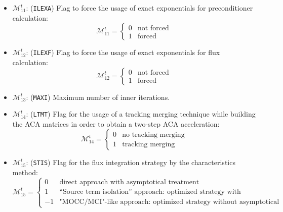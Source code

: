 \begin{itemize}
\item $\mathcal{M}^{t}_{11}$: ({\tt ILEXA}) Flag to force the usage of exact exponentials for preconditioner calculation:
\begin{displaymath}
\mathcal{M}^{t}_{11} = \left\{
\begin{array}{rl}
 0 & \textrm{not forced} \\
 1 & \textrm{forced}
\end{array} \right.
\end{displaymath}

\item $\mathcal{M}^{t}_{12}$: ({\tt ILEXF}) Flag to force the usage of exact exponentials for flux calculation:
\begin{displaymath}
\mathcal{M}^{t}_{12} = \left\{
\begin{array}{rl}
 0 & \textrm{not forced} \\
 1 & \textrm{forced}
\end{array} \right.
\end{displaymath}

\item $\mathcal{M}^{t}_{13}$: ({\tt MAXI}) Maximum number of inner iterations.

\item $\mathcal{M}^{t}_{14}$: ({\tt LTMT}) Flag for the usage of a tracking merging technique while building the ACA matrices in order to obtain a two-step ACA acceleration:
\begin{displaymath}
\mathcal{M}^{t}_{14} = \left\{
\begin{array}{rl}
 0 & \textrm{no tracking merging} \\
 1 & \textrm{tracking merging}
\end{array} \right.
\end{displaymath}

\item $\mathcal{M}^{t}_{15}$: ({\tt STIS}) Flag for the flux integration strategy by the characteristics method:
\begin{displaymath}
\mathcal{M}^{t}_{15} = \left\{
\begin{array}{rl}
 0 & \textrm{direct approach with asymptotical treatment} \\
 1 & \textrm{``Source term isolation'' approach: optimized strategy with asymptotical treatment} \\
-1 & \textrm{"MOCC/MCI"-like approach: optimized strategy without asymptotical treatment}
\end{array} \right.
\end{displaymath}


\end{itemize}
